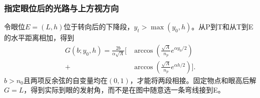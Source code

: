 \documentclass[UTF8,fontset=fandol,a4paper,11pt]{ctexart}
\begin{document}
\subsubsection*{指定眼位后的光路与上方视方向}
令眼位$E=(L,h)$位于转向后的下降段，$y_t>\max(y_0,h)$。从P到T和从T到E的水平距离相加，得到
\[
\begin{aligned}
G(b;y_0,h)=\frac{2b}{\alpha\sqrt A}\biggl[
&\arccos\left(\frac{\sqrt A}{n_p}e^{\alpha y_0/2}\right)\\
+&\arccos\left(\frac{\sqrt A}{n_p}e^{\alpha h/2}\right)
\biggr].
\end{aligned}
\]
$b>n_0$且两项反余弦的自变量均在$(0,1)$，才能将两段相接。固定物点和眼高后解$G=L$，得到实际到眼的发射角，而不是在图中随意选一条弯线接到E。
\begin{center}\begin{minipage}{.97\linewidth}\centering
{}
\end{minipage}
\end{center}
\end{document}
